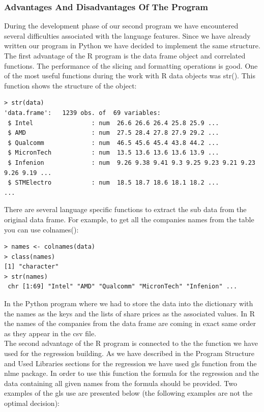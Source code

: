 \documentclass[
  twoside,
  12pt, a4paper,
  footinclude=true,
  headinclude=true,
  cleardoublepage=empty
]{article}
\begin{document}
\subsubsection{Advantages And Disadvantages Of The Program}
During the development phase of our second program we have encountered several difficulties associated with the language features. Since we have already written our program in Python we have decided to implement the same structure.\\
The first advantage of the R program is the data frame object and correlated functions. The performance of the slicing and formatting operations is good. One of the most useful functions during the work with R data objects was str(). This function shows the structure of the object:
\begin{verbatim}
> str(data)
'data.frame':   1239 obs. of  69 variables:
 $ Intel                : num  26.6 26.6 26.4 25.8 25.9 ...
 $ AMD                  : num  27.5 28.4 27.8 27.9 29.2 ...
 $ Qualcomm             : num  46.5 45.6 45.4 43.8 44.2 ...
 $ MicronTech           : num  13.5 13.6 13.6 13.6 13.9 ...
 $ Infenion             : num  9.26 9.38 9.41 9.3 9.25 9.23 9.21 9.23 9.26 9.19 ...
 $ STMElectro           : num  18.5 18.7 18.6 18.1 18.2 ...
...
\end{verbatim}
There are several language specific functions to extract the sub data from the original data frame. For example, to get all the companies names from the table you can use colnames():
\begin{verbatim}
> names <- colnames(data)
> class(names)
[1] "character"
> str(names)
 chr [1:69] "Intel" "AMD" "Qualcomm" "MicronTech" "Infenion" ...
\end{verbatim} 
In the Python program where we had to store the data into the dictionary with the names as the keys and the lists of share prices as the associated values. In R the names of the companies from the data frame are coming in exact same order as they appear in the csv file.\\
The second advantage of the R program is connected to the the function we have used for the regression building. As we have described in the Program Structure and Used Libraries sections for the regression we have used gls function from the nlme package. In order to use this function the formula for the regression and the data containing all given names from the formula should be provided. Two examples of the gls use are presented below (the following examples are not the optimal decision):
\end{document}
